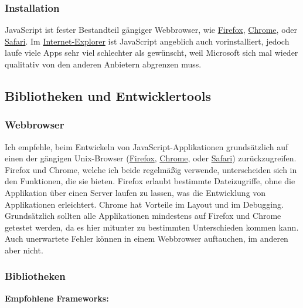 \subsubsection{\texorpdfstring{{Installation}}{Installation}}

{ JavaScript ist fester Bestandteil gängiger Webbrowser, wie
\href{http://de.wikipedia.org/wiki/Mozilla_Firefox}{Firefox},
\href{http://de.wikipedia.org/wiki/Google_Chrome}{Chrome}, oder
\href{http://de.wikipedia.org/wiki/Apple_Safari}{Safari}. Im
\href{http://de.wikipedia.org/wiki/Internet_Explorer}{Internet-Explorer}
ist JavaScript angeblich auch vorinstalliert, jedoch laufe viele Apps
sehr viel schlechter als gewünscht, weil Microsoft sich mal wieder
qualitativ von den anderen Anbietern abgrenzen muss. }

\subsection{\texorpdfstring{{Bibliotheken und
Entwicklertools}}{Bibliotheken und Entwicklertools}}

\subsubsection{\texorpdfstring{{Webbrowser}}{Webbrowser}}

{ Ich empfehle, beim Entwickeln von JavaScript-Applikationen
grundsätzlich auf einen der gängigen Unix-Browser
(\href{http://de.wikipedia.org/wiki/Mozilla_Firefox}{Firefox},
\href{http://de.wikipedia.org/wiki/Google_Chrome}{Chrome}, oder
\href{http://de.wikipedia.org/wiki/Apple_Safari}{Safari})
zurückzugreifen. Firefox und Chrome, welche ich beide regelmäßig
verwende, unterscheiden sich in den Funktionen, die sie bieten. Firefox
erlaubt bestimmte Dateizugriffe, ohne die Applikation über einen Server
laufen zu lassen, was die Entwicklung von Applikationen erleichtert.
Chrome hat Vorteile im Layout und im Debugging. Grundsätzlich sollten
alle Applikationen mindestens auf Firefox und Chrome getestet werden, da
es hier mitunter zu bestimmten Unterschieden kommen kann. Auch
unerwartete Fehler können in einem Webbrowser auftauchen, im anderen
aber nicht. }


\subsubsection{\texorpdfstring{{Bibliotheken}}{Bibliotheken}}

\vspace{0.5cm}\par\noindent\textbf{Empfohlene Frameworks:}\vspace{0.5cm}


